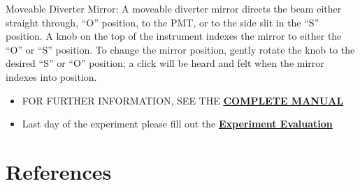 \documentclass{../lab}
\begin{document}
Moveable Diverter Mirror: A moveable diverter mirror directs the beam either straight through, ``O'' position, to the PMT, or to the side slit in the ``S'' position. A knob on the top of the instrument indexes the mirror to either the ``O'' or ``S'' position. To change the mirror position, gently rotate the knob to the desired ``S'' or ``O'' position; a click will be heard and felt when the mirror indexes into position.

\begin{itemize}
    \item FOR FURTHER INFORMATION, SEE THE \href{https://drive.google.com/file/d/1qrGTtcw9cd7z8blat9n5xlo_y_Rtyrm6/view?usp=drive_link}{\textbf{COMPLETE MANUAL}}

    \item Last day of the experiment please fill out the \href{\ExperimentEvaluation}{\textbf{Experiment Evaluation}}

\end{itemize}

\section{References}
\label{sec:References}
\end{document}
